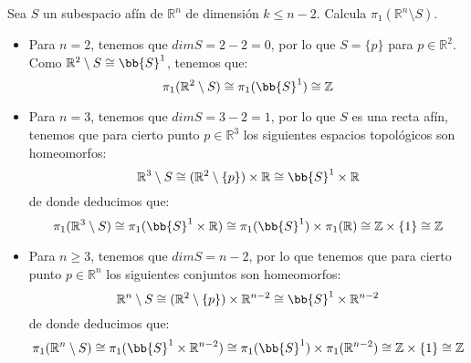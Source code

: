 \begin{ejercicio}
    Sea $S$ un subespacio afín de $\mathbb{R}^n$ de dimensión $k\leq n-2$. Calcula $\pi_1(\mathbb{R}^n\setminus S)$.\\

    \noindent
    \begin{itemize}
        \item Para $n=2$, tenemos que $dim S = 2-2 = 0$, por lo que $S = \{p\}$ para $p\in \mathbb{R}^2$. Como $\mathbb{R}^2\setminus S\cong \bb{S}^1$, tenemos que:
            \begin{equation*}
                \pi_1(\mathbb{R}^2 \setminus S)\cong \pi_1(\bb{S}^1) \cong \mathbb{Z} 
            \end{equation*}
        \item Para $n=3$, tenemos que $dim S = 3-2 = 1$, por lo que $S$ es una recta afín, tenemos que para cierto punto $p\in \mathbb{R}^3$ los siguientes espacios topológicos son homeomorfos:
            \begin{equation*}
                \mathbb{R}^3\setminus S \cong (\mathbb{R}^2\setminus\{p\})\times \mathbb{R} \cong \bb{S}^1\times \mathbb{R}
            \end{equation*}
            de donde deducimos que:
            \begin{equation*}
                \pi_1(\mathbb{R}^3\setminus S)\cong \pi_1(\bb{S}^1\times \mathbb{R}) \cong \pi_1(\bb{S}^1)\times \pi_1(\mathbb{R}) \cong \mathbb{Z}\times \{1\} \cong \mathbb{Z}
            \end{equation*}
        \item Para $n\geq 3$, tenemos que $dim S = n-2$, por lo que tenemos que para cierto punto $p\in \mathbb{R}^n$ los siguientes conjuntos son homeomorfos:
            \begin{equation*}
                \mathbb{R}^n\setminus S \cong (\mathbb{R}^2\setminus \{p\})\times \mathbb{R}^{n-2} \cong \bb{S}^1 \times \mathbb{R}^{n-2}
            \end{equation*}
            de donde deducimos que:
            \begin{equation*}
                \pi_1(\mathbb{R}^n\setminus S)\cong \pi_1(\bb{S}^1\times \mathbb{R}^{n-2}) \cong \pi_1(\bb{S}^1)\times \pi_1(\mathbb{R}^{n-2}) \cong \mathbb{Z}\times \{1\} \cong \mathbb{Z}
            \end{equation*}
    \end{itemize}
\end{ejercicio}

